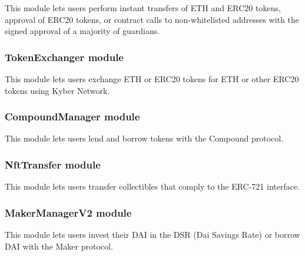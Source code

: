 \documentclass[12pt]{article}
\begin{document}
This module lets users perform instant transfers of ETH and ERC20 tokens, approval of ERC20 tokens, or contract calls to non-whitelisted addresses with the signed approval of a majority of guardians.

\subsubsection{TokenExchanger module}

This module lets users exchange ETH or ERC20 tokens for ETH or other ERC20 tokens using Kyber Network.

\subsubsection{CompoundManager module}

This module lets users lend and borrow tokens with the Compound protocol. 

\subsubsection{NftTransfer module}

This module lets users transfer collectibles that comply to the ERC-721 interface.  

\subsubsection{MakerManagerV2 module}

This module lets users invest their DAI in the DSR (Dai Savings Rate) or borrow DAI with the Maker protocol. 
\end{document}
